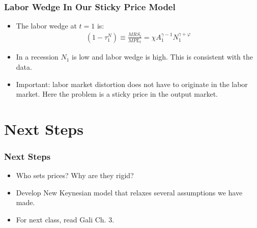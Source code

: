 \documentclass[english,xcolor=svgnames]{beamer}
\begin{document}
\begin{frame}
\frametitle{Labor Wedge In Our Sticky Price Model}
\begin{itemize}
	\item The labor wedge at $t=1$ is:
	\begin{align*}
		(1-\tau_1^N)\equiv\frac{MRS_t}{MPL_t}=\chi A_1^{\gamma-1}   N_1^{\gamma + \varphi} 
	\end{align*}
	\item In a recession $N_1$ is low and labor wedge is high. This is consistent with the data.
	\item Important: labor market distortion does not have to originate in the labor market. Here the problem is a sticky price in the output market.
\end{itemize}
\end{frame}



\section{Next Steps}

\begin{frame}
\frametitle{Next Steps
}
\begin{itemize}
	\item Who sets prices? Why are they rigid?
	\item Develop New Keynesian model that relaxes several assumptions we have made.
	\item For next class, read Gali Ch. 3. 
\end{itemize}
\end{frame}
\end{document}
